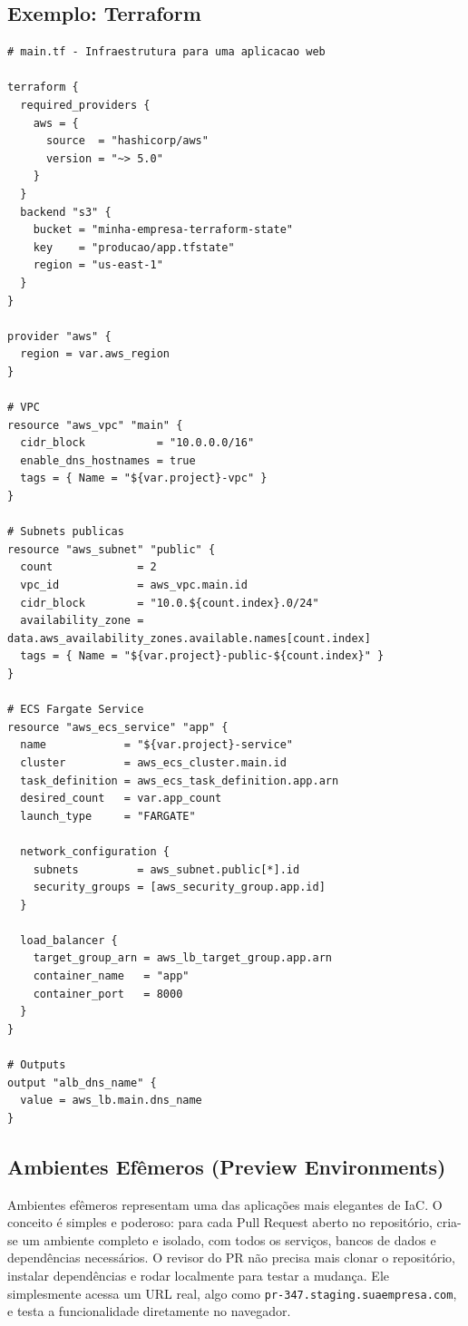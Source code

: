 \subsection{Exemplo: Terraform}

\begin{lstlisting}[language={}, caption={Infraestrutura com Terraform}]
# main.tf - Infraestrutura para uma aplicacao web

terraform {
  required_providers {
    aws = {
      source  = "hashicorp/aws"
      version = "~> 5.0"
    }
  }
  backend "s3" {
    bucket = "minha-empresa-terraform-state"
    key    = "producao/app.tfstate"
    region = "us-east-1"
  }
}

provider "aws" {
  region = var.aws_region
}

# VPC
resource "aws_vpc" "main" {
  cidr_block           = "10.0.0.0/16"
  enable_dns_hostnames = true
  tags = { Name = "${var.project}-vpc" }
}

# Subnets publicas
resource "aws_subnet" "public" {
  count             = 2
  vpc_id            = aws_vpc.main.id
  cidr_block        = "10.0.${count.index}.0/24"
  availability_zone = data.aws_availability_zones.available.names[count.index]
  tags = { Name = "${var.project}-public-${count.index}" }
}

# ECS Fargate Service
resource "aws_ecs_service" "app" {
  name            = "${var.project}-service"
  cluster         = aws_ecs_cluster.main.id
  task_definition = aws_ecs_task_definition.app.arn
  desired_count   = var.app_count
  launch_type     = "FARGATE"

  network_configuration {
    subnets         = aws_subnet.public[*].id
    security_groups = [aws_security_group.app.id]
  }

  load_balancer {
    target_group_arn = aws_lb_target_group.app.arn
    container_name   = "app"
    container_port   = 8000
  }
}

# Outputs
output "alb_dns_name" {
  value = aws_lb.main.dns_name
}
\end{lstlisting}

\subsection{Ambientes Efêmeros (Preview Environments)}
Ambientes efêmeros representam uma das aplicações mais elegantes de IaC. O
conceito é simples e poderoso: para cada Pull Request aberto no repositório,
cria-se um ambiente completo e isolado, com todos os serviços, bancos de dados
e dependências necessários. O revisor do PR não precisa mais clonar o repositório,
instalar dependências e rodar localmente para testar a mudança. Ele simplesmente
acessa um URL real, algo como \texttt{pr-347.staging.suaempresa.com}, e
testa a funcionalidade diretamente no navegador.

